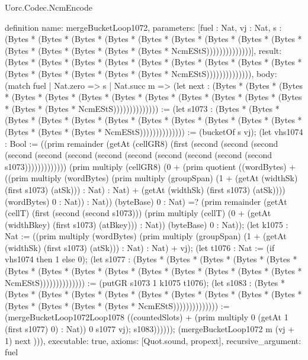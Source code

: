 \begin{lexlean}{Uorc.Codec.NcmEncode}
\begin{semanticmodule}
definition{
  name: mergeBucketLoop1072,
  parameters: [fuel : Nat, vj : Nat, s : (Bytes * (Bytes * (Bytes * (Bytes * (Bytes * (Bytes * (Bytes * (Bytes * (Bytes * (Bytes * (Bytes * (Bytes * (Bytes * (Bytes * NcmEStS))))))))))))))],
  result: (Bytes * (Bytes * (Bytes * (Bytes * (Bytes * (Bytes * (Bytes * (Bytes * (Bytes * (Bytes * (Bytes * (Bytes * (Bytes * (Bytes * NcmEStS)))))))))))))),
  body: (match fuel
    | Nat.zero => s
    | Nat.succ m => (let next : (Bytes * (Bytes * (Bytes * (Bytes * (Bytes * (Bytes * (Bytes * (Bytes * (Bytes * (Bytes * (Bytes * (Bytes * (Bytes * (Bytes * NcmEStS)))))))))))))) := (let s1073 : (Bytes * (Bytes * (Bytes * (Bytes * (Bytes * (Bytes * (Bytes * (Bytes * (Bytes * (Bytes * (Bytes * (Bytes * (Bytes * (Bytes * NcmEStS)))))))))))))) := (bucketOf s vj); (let vhs1074 : Bool := ((prim remainder (getAt (cellGR8) (first (second (second (second (second (second (second (second (second (second (second (second (second s1073))))))))))))) (prim multiply (cellGR8) (0 + (prim quotient ((wordBytes) + ((prim multiply (wordBytes) (prim multiply (groupSpan) (1 + (getAt (widthSk) (first s1073) (atSk))) : Nat) : Nat) + (getAt (widthSk) (first s1073) (atSk)))) (wordBytes) 0 : Nat)) : Nat)) (byteBase) 0 : Nat) =? (prim remainder (getAt (cellT) (first (second (second s1073))) (prim multiply (cellT) (0 + (getAt (widthBkey) (first s1073) (atBkey))) : Nat)) (byteBase) 0 : Nat)); (let k1075 : Nat := ((prim multiply (wordBytes) (prim multiply (groupSpan) (1 + (getAt (widthSk) (first s1073) (atSk))) : Nat) : Nat) + vj); (let t1076 : Nat := (if vhs1074 then 1 else 0); (let s1077 : (Bytes * (Bytes * (Bytes * (Bytes * (Bytes * (Bytes * (Bytes * (Bytes * (Bytes * (Bytes * (Bytes * (Bytes * (Bytes * (Bytes * NcmEStS)))))))))))))) := (putGR s1073 1 k1075 t1076); (let s1083 : (Bytes * (Bytes * (Bytes * (Bytes * (Bytes * (Bytes * (Bytes * (Bytes * (Bytes * (Bytes * (Bytes * (Bytes * (Bytes * (Bytes * NcmEStS)))))))))))))) := (mergeBucketLoop1072Loop1078 ((countedSlots) + (prim multiply 0 (getAt 1 (first s1077) 0) : Nat)) 0 s1077 vj); s1083)))))); (mergeBucketLoop1072 m (vj + 1) next ))),
  executable: true,
  axioms: [Quot.sound, propext],
  recursive_argument: fuel
}


\end{semanticmodule}
\end{lexlean}
